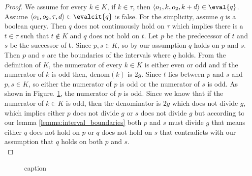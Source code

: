 \begin{proof}
    We assume for every $k \in K$, if $k \in \tau$, then $\langle o_1, k,
    o_2, k+d \rangle \in \eval{q}$. Assume $\langle o_1,o_2,\tau,d
    \rangle \in \evalcit{q}$ is false. For the simplicity, assume $q$ is a
    boolean query. Then $q$ does not continuously
    hold on $\tau$ which implies there is a $t \in \tau$ such that $t \not\in K$ and $q$ does not hold on $t$.
Let $p$ be the predecessor of $t$ and $s$ be the successor of t. Since $p,s
    \in K$, so by our assumption $q$ holds on $p$ and $s$.  
Then $p$ and $s$ are the boundaries of the intervals where $q$ holds. From the
definition of $K$, the numerator of every $k \in K$ is either even or odd and if the numerator of $k$ 
is odd then, $\mathrm{denom}(k)$ is $2g$. Since $t$ lies
between $p$ and $s$ and $p,s \in K$, so either the numerator of $p$ is odd or
the numerator of $s$ is odd. As shown in Figure. \ref{fig:pspace}, the numerator of $p$
is odd. Since we know that if the numerator of $k \in K$ is odd, then the denominator is $2g$ which does
not divide
$g$, which implies either $p$ does not divide $g$ or $s$ does not divide $g$
but according to our lemma \ref{lemma:interval_boundaries} both $p$ and $s$ must divide $g$ that means either $q$ does not hold on $p$ or $q$ does not hold on $s$ that contradicts with our assumption that $q$ holds on both $p$ and $s$.\\ 


\end{proof}


\begin{figure}[!htbp]
\centering
{}
\caption{caption}
\label{fig:pspace}
\end{figure}

